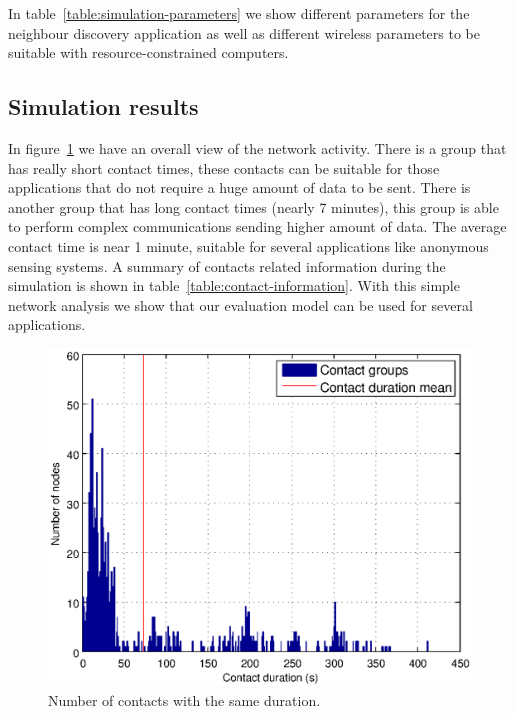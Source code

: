 In table~\ref{table:simulation-parameters} we show different parameters for the neighbour discovery application as well as different wireless parameters to be suitable with resource-constrained computers.

\subsection{Simulation results}


In figure~\ref{fig:contact-duration-group} we have an overall view of the network activity. There is a group that has really short contact times, these contacts can be suitable for those applications that do not require a huge amount of data to be sent. There is another group that has long contact times (nearly 7 minutes), this group is able to perform complex communications sending higher amount of data. The average contact time is near 1 minute, suitable for several applications like anonymous sensing systems. A summary of contacts related information during the simulation is shown in table~\ref{table:contact-information}. With this simple network analysis we show that our evaluation model can be used for several applications. 

\begin{figure}[hbt]
  \centering
  \includegraphics[scale=0.70]{imgs/statistics/contacts-duration}
  \caption{Number of contacts with the same duration.}
  \label{fig:contact-duration-group}
\end{figure}

